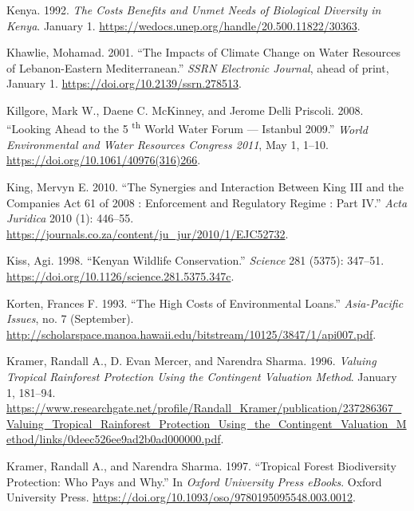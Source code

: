 \begin{CSLReferences}{1}{1}
Kenya. 1992. \emph{The Costs Benefits and Unmet Needs of Biological
Diversity in Kenya}. January 1.
\url{https://wedocs.unep.org/handle/20.500.11822/30363}.

Khawlie, Mohamad. 2001. {``The Impacts of Climate Change on Water
Resources of Lebanon-Eastern Mediterranean.''} \emph{SSRN Electronic
Journal}, ahead of print, January 1.
\url{https://doi.org/10.2139/ssrn.278513}.

Killgore, Mark W., Daene C. McKinney, and Jerome Delli Priscoli. 2008.
{``Looking Ahead to the 5 \textsuperscript{th} World Water Forum ---
Istanbul 2009.''} \emph{World Environmental and Water Resources Congress
2011}, May 1, 1--10. \url{https://doi.org/10.1061/40976(316)266}.

King, Mervyn E. 2010. {``The Synergies and Interaction Between King III
and the Companies Act 61 of 2008 : Enforcement and Regulatory Regime :
Part IV.''} \emph{Acta Juridica} 2010 (1): 446--55.
\url{https://journals.co.za/content/ju_jur/2010/1/EJC52732}.

Kiss, Agi. 1998. {``Kenyan Wildlife Conservation.''} \emph{Science} 281
(5375): 347--51. \url{https://doi.org/10.1126/science.281.5375.347c}.

Korten, Frances F. 1993. {``The High Costs of Environmental Loans.''}
\emph{Asia-Pacific Issues}, no. 7 (September).
\url{http://scholarspace.manoa.hawaii.edu/bitstream/10125/3847/1/api007.pdf}.

Kramer, Randall A., D. Evan Mercer, and Narendra Sharma. 1996.
\emph{Valuing Tropical Rainforest Protection Using the Contingent
Valuation Method}. January 1, 181--94.
\url{https://www.researchgate.net/profile/Randall_Kramer/publication/237286367_Valuing_Tropical_Rainforest_Protection_Using_the_Contingent_Valuation_Method/links/0deec526ee9ad2b0ad000000.pdf}.

Kramer, Randall A., and Narendra Sharma. 1997. {``Tropical Forest
Biodiversity Protection: Who Pays and Why.''} In \emph{Oxford University
Press eBooks}. Oxford University Press.
\url{https://doi.org/10.1093/oso/9780195095548.003.0012}.


\end{CSLReferences}
